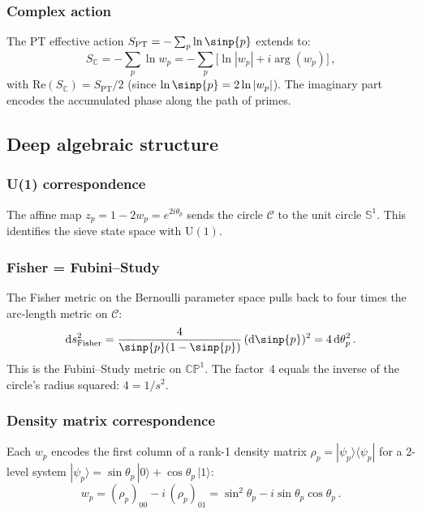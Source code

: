 \documentclass[12pt,a4paper]{article}
\begin{document}
\subsubsection{Complex action}

The PT effective action $S_{\mathrm{PT}} = -\sum_p \ln\sinp{p}$
extends to:
\begin{equation}
  S_{\mathbb{C}} = -\sum_p \ln w_p
  = -\sum_p \bigl[\ln|w_p| + i\arg(w_p)\bigr]\,,
  \label{eq:S_complex}
\end{equation}
with $\mathrm{Re}(S_{\mathbb{C}}) = S_{\mathrm{PT}}/2$ (since
$\ln\sinp{p} = 2\ln|w_p|$). The imaginary part encodes the accumulated
phase along the path of primes.


\subsection{Deep algebraic structure}
\label{sec:cx_algebra}

\subsubsection{U(1) correspondence}

The affine map $z_p = 1 - 2w_p = e^{2i\theta_p}$ sends the circle
$\mathcal{C}$ to the unit circle $\mathbb{S}^1$. This identifies
the sieve state space with $\mathrm{U}(1)$.

\subsubsection{Fisher = Fubini--Study}

The Fisher metric on the Bernoulli parameter space pulls back to
four times the arc-length metric on $\mathcal{C}$:
\begin{equation}
  \mathrm{d}s^2_{\mathrm{Fisher}}
  = \frac{4}{\sinp{p}(1 - \sinp{p})}\,(\mathrm{d}\sinp{p})^2
  = 4\,\mathrm{d}\theta_p^2\,.
  \label{eq:fisher_fubini}
\end{equation}
This is the Fubini--Study metric on $\mathbb{CP}^1$.
The factor~4 equals the inverse of the circle's radius squared: $4 = 1/s^2$.

\subsubsection{Density matrix correspondence}
\label{subsec:cx_density}

Each $w_p$ encodes the first column of a rank-1 density matrix
$\rho_p = |\psi_p\rangle\langle\psi_p|$ for a 2-level system
$|\psi_p\rangle = \sin\theta_p\,|0\rangle + \cos\theta_p\,|1\rangle$:
\begin{equation}
  w_p = (\rho_p)_{00} - i\,(\rho_p)_{01}
  = \sin^2\theta_p - i\sin\theta_p\cos\theta_p\,.
  \label{eq:density}
\end{equation}
\end{document}

